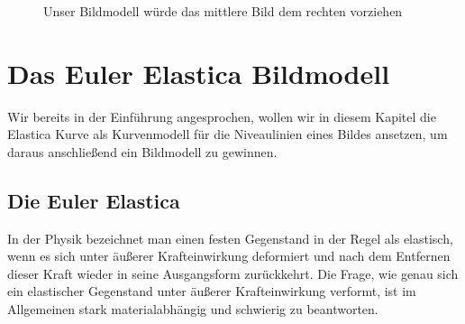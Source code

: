 \documentclass{mythesis}
\begin{document}
\begin{figure}[ht]
    \begin{subfigure}[b]{0.33\textwidth}
	\centering
    \end{subfigure}%
    \begin{subfigure}[b]{0.33\textwidth}
	\centering
    \end{subfigure}%
    \begin{subfigure}[b]{0.33\textwidth}
	\centering
    \end{subfigure}
    \caption{Unser Bildmodell würde das mittlere Bild dem rechten vorziehen}
    \label{fig:inpainting_texture}
\end{figure}


\chapter{Das Euler Elastica Bildmodell} \label{chap:image_model}


Wir bereits in der Einführung angesprochen, wollen wir in diesem Kapitel die Elastica Kurve als Kurvenmodell für die Niveaulinien eines Bildes ansetzen, um daraus anschließend ein Bildmodell zu gewinnen.

\section{Die Euler Elastica}

In der Physik bezeichnet man einen festen Gegenstand in der Regel als elastisch, wenn es sich unter äußerer Krafteinwirkung deformiert und nach dem Entfernen dieser Kraft wieder in seine Ausgangsform zurückkehrt.
Die Frage, wie genau sich ein elastischer Gegenstand unter äußerer Krafteinwirkung verformt, ist im Allgemeinen stark materialabhängig und schwierig zu beantworten.
\end{document}
